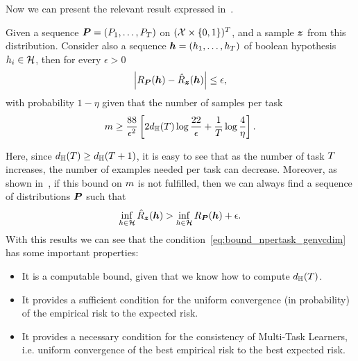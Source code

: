 Now we can present the relevant result expressed in~\cite[Corollary~13]{baxter2000model}.
\begin{theorem}\label{th:baxter_vcdim}
    Given a sequence $\bm{P} = (P_1, \ldots, P_T)$ on $(\mathcal{X} \times \left\{0, 1\right\})^T$, and a sample $\bm{z}$ from this distribution. Consider also a sequence $\bm{h} = (h_1, \ldots, h_T)$ of boolean hypothesis $h_i \in \mathcal{H}$, then for every $\epsilon > 0$
\begin{equation}
    \nonumber
    \left|R_{\bm{P}}(\bm{h}) - \hat{R}_{\bm{z}}(\bm{h})\right| \leq \epsilon,
\end{equation}
with probability $1 - \eta$ given that the number of samples per task
\begin{equation}
    \label{eq:bound_npertask_genvcdim}
    \npertask \geq \frac{88}{\epsilon^2} \left[2 d_\hypspacef(\ntasks) \log \frac{22}{\epsilon} + \frac{1}{\ntasks}\log\frac{4}{\eta} \right] .
\end{equation}
\end{theorem}
Here, since $d_{\mathbb{H}}(T) \geq d_{\mathbb{H}}(T+1)$, it is easy to see that as the number of task $T$ increases, the number of examples needed per task can decrease. 
Moreover, as shown in~\cite[Theorem~14]{baxter2000model}, if this bound on $m$ is not fulfilled, then we can always find a sequence of distributions $\bm{P}$ such that
\begin{equation}
    \nonumber
    \inf_{h \in \mathcal{H}} \hat{R}_{\bm{z}}(\bm{h}) > \inf_{h \in \mathcal{H}} R_{\bm{P}}(\bm{h}) + \epsilon .
\end{equation}
With this results we can see that the condition~\eqref{eq:bound_npertask_genvcdim} has some important properties:
\begin{itemize}
    \item It is a computable bound, given that we know how to compute $d_{\mathbb{H}}(T)$.
    \item It provides a sufficient condition for the uniform convergence (in probability) of the empirical risk to the expected risk.
    \item It provides a necessary condition for the consistency of Multi-Task Learners, i.e. uniform convergence of the best empirical risk to the best expected risk.
\end{itemize}

